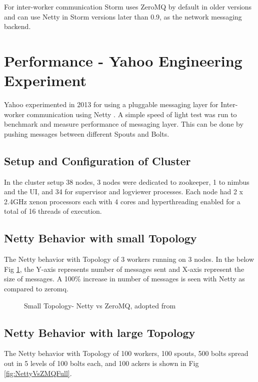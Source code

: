 \documentclass[9pt,twocolumn,twoside]{../../styles/osajnl}
\begin{document}
For inter-worker communication Storm uses ZeroMQ by default in older
versions and can use Netty in Storm versions later than 0.9, as the
network messaging backend.

\section{Performance - Yahoo Engineering Experiment}

Yahoo experimented in 2013 for using a pluggable messaging layer for
Inter-worker communication using Netty \cite{article-storm-netty}. A
simple speed of light test was run to benchmark and measure
performance of messaging layer. This can be done by pushing messages
between different Spouts and Bolts.

\subsection{Setup and Configuration of Cluster}
In the cluster setup 38 nodes, 3 nodes were dedicated to zookeeper, 1
to nimbus and the UI, and 34 for supervisor and logviewer processes.
Each node had 2 x 2.4GHz xenon processors each with 4 cores and
hyperthreading enabled for a total of 16 threads of execution.

\subsection{Netty Behavior with small Topology}
The Netty behavior with Topology of 3 workers running on 3 nodes. In
the below Fig \ref{fig:nettyvzmq-small}, the Y-axis represents number
of messages sent and X-axis represent the size of messages. A 100\%
increase in number of messages is seen with Netty as compared to
zeromq.

\begin{figure}[htbp]
	\centering
	\caption{Small Topology- Netty vs ZeroMQ, adopted from
          \cite{article-storm-netty} }
	\label{fig:nettyvzmq-small}
\end{figure}



\subsection{Netty Behavior with large Topology}
The Netty behavior with Topology of 100 workers, 100 spouts, 500 bolts
spread out in 5 levels of 100 bolts each, and 100 ackers is shown in
Fig \ref{fig:NettyVsZMQFull}.
\end{document}
